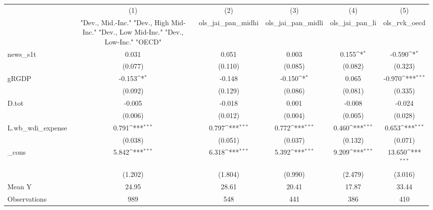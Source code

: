 {
\def\sym#1{\ifmmode^{#1}\else\(^{#1}\)\fi}
\begin{tabular}{l*{5}{c}}
\toprule
            &\multicolumn{1}{c}{(1)}&\multicolumn{1}{c}{(2)}&\multicolumn{1}{c}{(3)}&\multicolumn{1}{c}{(4)}&\multicolumn{1}{c}{(5)}\\
            &\multicolumn{1}{c}{ "Dev., Mid.-Inc." "Dev., High Mid-Inc." "Dev., Low Mid-Inc." "Dev., Low-Inc." "OECD" }&\multicolumn{1}{c}{ols\_jai\_pan\_midhi}&\multicolumn{1}{c}{ols\_jai\_pan\_midli}&\multicolumn{1}{c}{ols\_jai\_pan\_li}&\multicolumn{1}{c}{ols\_rvk\_oecd}\\
\midrule
news\_s1t    &       0.031         &       0.051         &       0.003         &       0.155\sym{*}  &      -0.590\sym{*}  \\
            &     (0.077)         &     (0.110)         &     (0.085)         &     (0.082)         &     (0.323)         \\
\addlinespace
gRGDP       &      -0.153\sym{*}  &      -0.148         &      -0.150\sym{*}  &       0.065         &      -0.970\sym{***}\\
            &     (0.092)         &     (0.129)         &     (0.086)         &     (0.081)         &     (0.335)         \\
\addlinespace
D.tot       &      -0.005         &      -0.018         &       0.001         &      -0.008         &      -0.024         \\
            &     (0.006)         &     (0.012)         &     (0.004)         &     (0.005)         &     (0.028)         \\
\addlinespace
L.wb\_wdi\_expense&       0.791\sym{***}&       0.797\sym{***}&       0.772\sym{***}&       0.460\sym{***}&       0.653\sym{***}\\
            &     (0.038)         &     (0.051)         &     (0.037)         &     (0.132)         &     (0.071)         \\
\addlinespace
\_cons      &       5.842\sym{***}&       6.318\sym{***}&       5.392\sym{***}&       9.209\sym{***}&      13.650\sym{***}\\
            &     (1.202)         &     (1.804)         &     (0.990)         &     (2.479)         &     (3.016)         \\
\midrule
Mean Y      &       24.95         &       28.61         &       20.41         &       17.87         &       33.44         \\
Observations&         989         &         548         &         441         &         386         &         410         \\
\bottomrule
\end{tabular}
}
